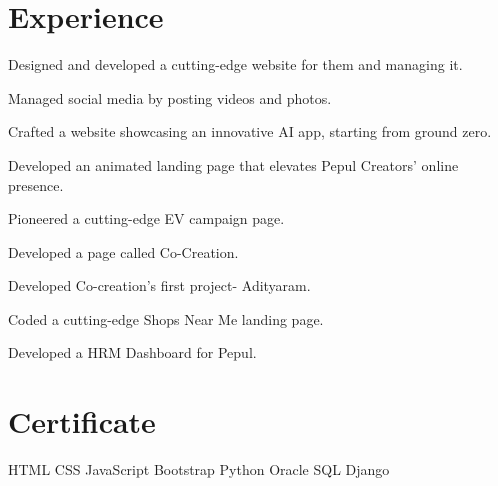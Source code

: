 \documentclass[]{deedy-resume-openfont}
\begin{document}
\begin{minipage}[t]{0.66\textwidth} 


\section{Experience}
\vspace{\topsep} %
\begin{tightemize}
\item Designed and developed a cutting-edge website for them and managing it.
\item Managed social media by posting videos and photos. 
\end{tightemize}
\sectionsep

\vspace{\topsep} %
\begin{tightemize}
\item Crafted a website showcasing an innovative AI app, starting from ground zero.
\item Developed an animated landing page that elevates Pepul Creators’ online presence.
\item Pioneered a cutting-edge EV campaign page.
\item Developed a page called Co-Creation.
\item Developed Co-creation's first project- Adityaram.
\item Coded a cutting-edge Shops Near Me landing page.
\item Developed a HRM Dashboard for Pepul.
\end{tightemize}
\sectionsep

\section{Certificate}
 \textbullet{} HTML \textbullet{} CSS \textbullet{} JavaScript \textbullet{} Bootstrap \textbullet{} Python \textbullet{} Oracle SQL \textbullet{} Django
\sectionsep


\end{minipage}
\end{document}

